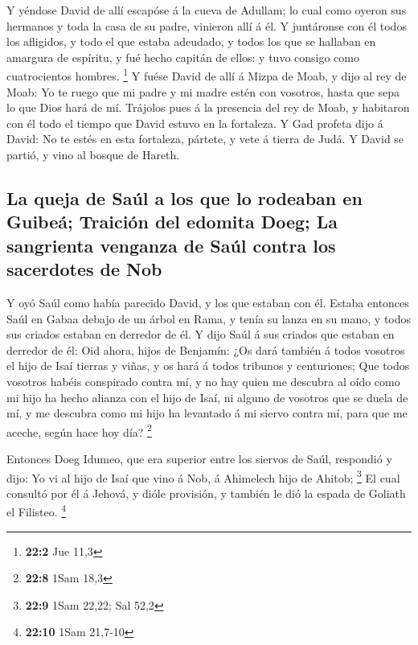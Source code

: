  Y yéndose David de allí escapóse á la cueva de Adullam;
lo cual como oyeron sus hermanos y toda la casa de su padre, vinieron
allí á él.  Y juntáronse con él todos los afligidos, y
todo el que estaba adeudado, y todos los que se hallaban en amargura de
espíritu, y fué hecho capitán de ellos: y tuvo consigo como
cuatrocientos hombres. \footnote{\textbf{22:2} Jue 11,3} 
Y fuése David de allí á Mizpa de Moab, y dijo al rey de Moab: Yo te
ruego que mi padre y mi madre estén con vosotros, hasta que sepa lo que
Dios hará de mí.  Trájolos pues á la presencia del rey de
Moab, y habitaron con él todo el tiempo que David estuvo en la
fortaleza.  Y Gad profeta dijo á David: No te estés en
esta fortaleza, pártete, y vete á tierra de Judá. Y David se partió, y
vino al bosque de Hareth.

\hypertarget{la-queja-de-sauxfal-a-los-que-lo-rodeaban-en-guibeuxe1-traiciuxf3n-del-edomita-doeg-la-sangrienta-venganza-de-sauxfal-contra-los-sacerdotes-de-nob}{%
\subsection{La queja de Saúl a los que lo rodeaban en Guibeá; Traición
del edomita Doeg; La sangrienta venganza de Saúl contra los sacerdotes
de
Nob}\label{la-queja-de-sauxfal-a-los-que-lo-rodeaban-en-guibeuxe1-traiciuxf3n-del-edomita-doeg-la-sangrienta-venganza-de-sauxfal-contra-los-sacerdotes-de-nob}}

 Y oyó Saúl como había parecido David, y los que estaban
con él. Estaba entonces Saúl en Gabaa debajo de un árbol en Rama, y
tenía su lanza en su mano, y todos sus criados estaban en derredor de
él.  Y dijo Saúl á sus criados que estaban en derredor de
él: Oid ahora, hijos de Benjamín: ¿Os dará también á todos vosotros el
hijo de Isaí tierras y viñas, y os hará á todos tribunos y centuriones;
 Que todos vosotros habéis conspirado contra mí, y no hay
quien me descubra al oído como mi hijo ha hecho alianza con el hijo de
Isaí, ni alguno de vosotros que se duela de mí, y me descubra como mi
hijo ha levantado á mi siervo contra mí, para que me aceche, según hace
hoy día? \footnote{\textbf{22:8} 1Sam 18,3}

 Entonces Doeg Idumeo, que era superior entre los siervos
de Saúl, respondió y dijo: Yo vi al hijo de Isaí que vino á Nob, á
Ahimelech hijo de Ahitob; \footnote{\textbf{22:9} 1Sam 22,22; Sal 52,2}
 El cual consultó por él á Jehová, y dióle provisión, y
también le dió la espada de Goliath el Filisteo. \footnote{\textbf{22:10}
  1Sam 21,7-10}

